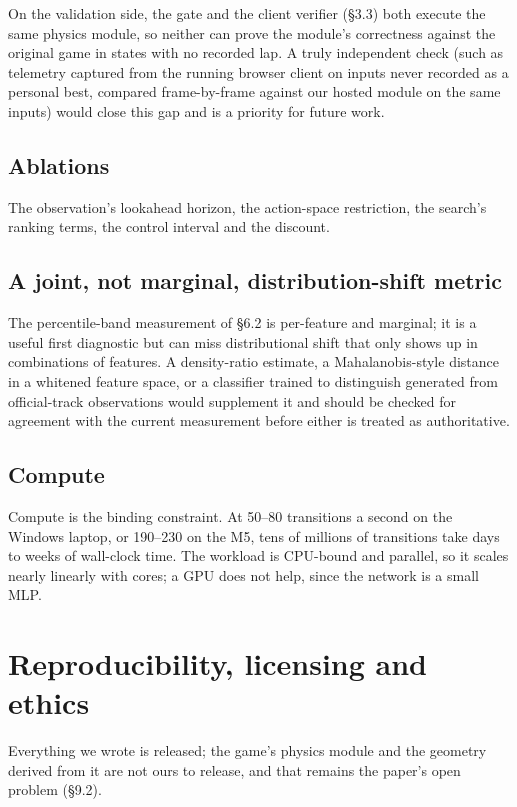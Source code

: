 \documentclass[11pt]{article}
\begin{document}
On the validation side, the gate and the client verifier (\S3.3) both execute the same physics module, so neither can prove the module's correctness against the original game in states with no recorded lap. A truly independent check (such as telemetry captured from the running browser client on inputs never recorded as a personal best, compared frame-by-frame against our hosted module on the same inputs) would close this gap and is a priority for future work.

\subsection{Ablations}

The observation's lookahead horizon, the action-space restriction, the search's ranking terms, the control interval and the discount.

\subsection{A joint, not marginal, distribution-shift metric}

The percentile-band measurement of \S6.2 is per-feature and marginal; it is a useful first diagnostic but can miss distributional shift that only shows up in combinations of features. A density-ratio estimate, a Mahalanobis-style distance in a whitened feature space, or a classifier trained to distinguish generated from official-track observations would supplement it and should be checked for agreement with the current measurement before either is treated as authoritative.

\subsection{Compute}

Compute is the binding constraint. At 50--80 transitions a second on the Windows laptop, or 190--230 on the M5, tens of millions of transitions take days to weeks of wall-clock time. The workload is CPU-bound and parallel, so it scales nearly linearly with cores; a GPU does not help, since the network is a small MLP.

\section{Reproducibility, licensing and ethics}

Everything we wrote is released; the game's physics module and the geometry derived from it are not ours to release, and that remains the paper's open problem (\S9.2).
\end{document}

